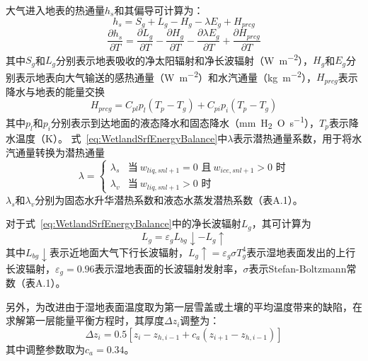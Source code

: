 大气进入地表的热通量$h_s$和其偏导可计算为：
\begin{equation}\label{eq:WetlandSrfEnergyBalance}
    h_s = S_g + L_g - H_g - \lambda E_g + H_{prcg}
\end{equation}
\begin{equation}
    \frac{\partial h_s}{\partial T} = \frac{\partial L_g}{\partial T} -\frac{\partial H_g}{\partial T} -\frac{\partial \lambda E_g}{\partial T} +\frac{\partial H_{prcg}}{\partial T}
\end{equation}
其中$S_g$和$L_g$分别表示地表吸收的净太阳辐射和净长波辐射（\unit{W.m^{-2}}），$H_g$和$E_g$分别表示地表向大气输送的感热通量（\unit{W.m^{-2}}）和水汽通量（\unit{kg.m^{-2}}），$H_{prcg}$表示降水与地表的能量交换
\begin{equation}
    H_{prcg} = C_{pl}p_l\left(T_p-T_g\right) + C_{pi}p_i\left(T_p-T_g\right)
\end{equation}
其中$p_l$和$p_i$分别表示到达地面的液态降水和固态降水（\unit{mm.H_2O.s^{-1}}），$T_p$表示降水温度（K）。
式~\eqref{eq:WetlandSrfEnergyBalance}中$\lambda$表示潜热通量系数，用于将水汽通量转换为潜热通量
\begin{equation}
    \lambda = \begin{cases}
        \lambda_s &\text{当}\ w_{liq,snl+1}=0\text{ 且}\ w_{ice,snl+1}>0\text{ 时}\\
        \lambda_v &\text{当}\ w_{liq,snl+1}>0\text{ 时}
    \end{cases}
\end{equation}
$\lambda_s$和$\lambda_v$分别为固态水升华潜热系数和液态水蒸发潜热系数（表A.1）。

对于式~\eqref{eq:WetlandSrfEnergyBalance}中的净长波辐射$L_g$，其可计算为
\begin{equation}
    L_g = \varepsilon_g L_{bg}\downarrow - L_g\uparrow
\end{equation}
其中$L_{bg}\downarrow$表示近地面大气下行长波辐射，$L_g\uparrow=\varepsilon_g\sigma T^4_g$表示湿地表面发出的上行长波辐射，$\varepsilon_g=0.96$表示湿地表面的长波辐射发射率，$\sigma$表示Stefan-Boltzmann常数（表A.1）。

另外，为改进由于湿地表面温度取为第一层雪盖或土壤的平均温度带来的缺陷，在求解第一层能量平衡方程时，其厚度$\Delta z_i$调整为：
\begin{equation}
    \Delta z_i = 0.5\left[z_i-z_{h,i-1}+c_a\left(z_{i+1}-z_{h,i-1}\right)\right]
\end{equation}
其中调整参数取为$c_a=0.34$。

